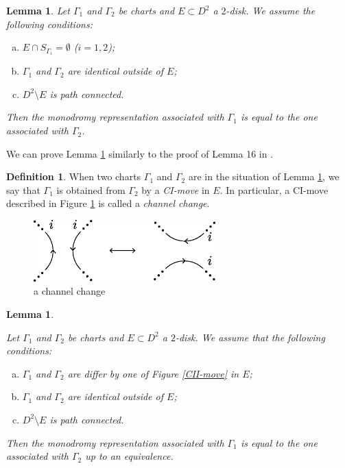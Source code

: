 \documentclass{amsart}
\theoremstyle{plain}
\newtheorem{lem}[thm]{Lemma}
\theoremstyle{definition}
\newtheorem{defn}[thm]{Definition}
\begin{document}
\begin{lem}\label{CI}
Let $\Gamma_1$ and $\Gamma_2$ be charts and $E\subset D^2$ a $2$-disk. 
We assume the following conditions:

\begin{enumerate}[(a)]
\setlength{\itemindent}{5pt}
\item $E\cap S_{\Gamma_i}=\emptyset$ ($i=1,2$); 

\item $\Gamma_1$ and $\Gamma_2$ are identical outside of $E$; 

\item $D^2\setminus E$ is path connected. 

\end{enumerate}


\noindent
Then the monodromy representation associated with $\Gamma_1$ is equal to the one associated with $\Gamma_2$. 

\end{lem}

We can prove Lemma \ref{CI} similarly to the proof of Lemma 16 in \cite{KMMW}. 

\begin{defn}
When two charts $\Gamma_1$ and $\Gamma_2$ are in the situation of Lemma \ref{CI}, we say that $\Gamma_1$ is obtained from $\Gamma_2$ by a {\it CI-move} in $E$. 
In particular, a CI-move described in Figure \ref{channel change} is called a {\it channel change}. 

\begin{figure}[htbp]
\begin{center}
\includegraphics[width=70mm]{channel_change.eps}
\end{center}
\caption{a channel change}
\label{channel change}
\end{figure}

\end{defn}

\begin{lem}\label{CII}

Let $\Gamma_1$ and $\Gamma_2$ be charts and $E\subset D^2$ a $2$-disk. 
We assume that the following conditions:

\begin{enumerate}[(a)]
\setlength{\itemindent}{5pt}
\item $\Gamma_1$ and $\Gamma_2$ are differ by one of Figure \ref{CII-move} in $E$; 

\item $\Gamma_1$ and $\Gamma_2$ are identical outside of $E$; 

\item $D^2\setminus E$ is path connected. 

\end{enumerate}
\noindent
Then the monodromy representation associated with $\Gamma_1$ is equal to the one associated with $\Gamma_2$ up to an equivalence. 

\end{lem}
\end{document}
